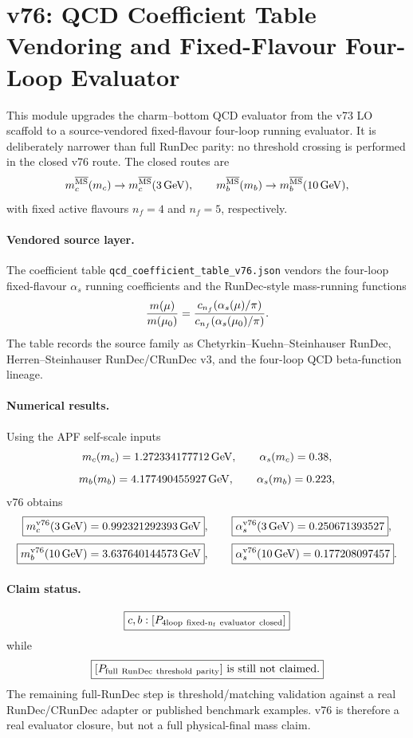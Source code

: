 
\section{v76: QCD Coefficient Table Vendoring and Fixed-Flavour Four-Loop Evaluator}

This module upgrades the charm--bottom QCD evaluator from the v73 LO scaffold to a source-vendored fixed-flavour four-loop running evaluator.  It is deliberately narrower than full RunDec parity: no threshold crossing is performed in the closed v76 route.  The closed routes are
\[
 m_c^{\overline{\rm MS}}(m_c)\to m_c^{\overline{\rm MS}}(3\,{\rm GeV}),
 \qquad
 m_b^{\overline{\rm MS}}(m_b)\to m_b^{\overline{\rm MS}}(10\,{\rm GeV}),
\]
with fixed active flavours \(n_f=4\) and \(n_f=5\), respectively.

\paragraph{Vendored source layer.}
The coefficient table \texttt{qcd\_coefficient\_table\_v76.json} vendors the four-loop fixed-flavour \(\alpha_s\) running coefficients and the RunDec-style mass-running functions
\[
 {m(\mu)\over m(\mu_0)}={c_{n_f}(\alpha_s(\mu)/\pi)\over c_{n_f}(\alpha_s(\mu_0)/\pi)}.
\]
The table records the source family as Chetyrkin--Kuehn--Steinhauser RunDec, Herren--Steinhauser RunDec/CRunDec v3, and the four-loop QCD beta-function lineage.

\paragraph{Numerical results.}
Using the APF self-scale inputs
\[
 m_c(m_c)=1.272334177712\, {\rm GeV},\qquad \alpha_s(m_c)=0.38,
\]
\[
 m_b(m_b)=4.177490455927\, {\rm GeV},\qquad \alpha_s(m_b)=0.223,
\]
v76 obtains
\[
 \boxed{m_c^{\rm v76}(3\,{\rm GeV})=0.992321292393\,{\rm GeV}},
 \qquad
 \boxed{\alpha_s^{\rm v76}(3\,{\rm GeV})=0.250671393527},
\]
\[
 \boxed{m_b^{\rm v76}(10\,{\rm GeV})=3.637640144573\,{\rm GeV}},
 \qquad
 \boxed{\alpha_s^{\rm v76}(10\,{\rm GeV})=0.177208097457}.
\]

\paragraph{Claim status.}
\[
 \boxed{c,b:[P_{\rm 4loop\ fixed\text{-}n_f\ evaluator\ closed}]}
\]
while
\[
 \boxed{[P_{\rm full\ RunDec\ threshold\ parity}]\ \text{is still not claimed}.}
\]
The remaining full-RunDec step is threshold/matching validation against a real RunDec/CRunDec adapter or published benchmark examples.  v76 is therefore a real evaluator closure, but not a full physical-final mass claim.
